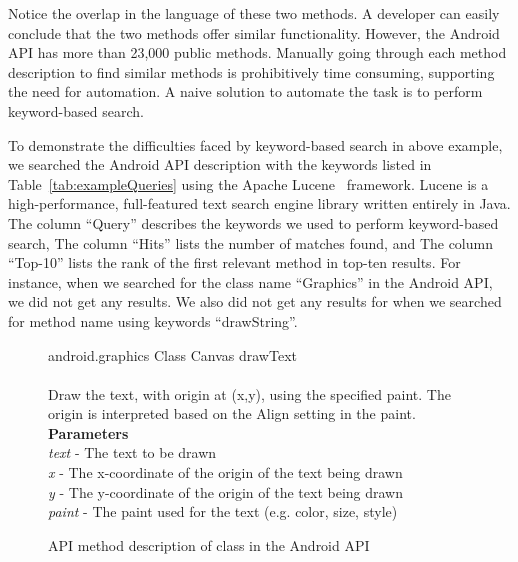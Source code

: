 Notice the overlap in the language of these two methods.
A developer can easily conclude that
the two methods offer similar functionality.
However, the Android API has more than 23,000 public methods.
Manually going through each method description to find similar methods
is prohibitively time consuming, supporting the need for automation.
A naive solution to automate the task is to perform keyword-based search. 
 
To demonstrate the difficulties faced by keyword-based search in above example,
we searched the Android API description with the keywords listed in Table~\ref{tab:exampleQueries} using the Apache Lucene~\cite{lucene} framework.
Lucene is a high-performance, full-featured text search engine library written entirely in Java.
The column ``Query'' describes the keywords we used to perform keyword-based search,
The column ``Hits'' lists the number of matches found, and
The column ``Top-10'' lists the rank of the first relevant method in top-ten results.
For instance, when we searched for the class name ``Graphics'' in the Android API,
we did not get any results.
We also did not get any results for when we searched for method name using keywords ``drawString''. 

\begin{figure}
	\begin{framed}
		\begin{small}
			{\small android.graphics} {\normalsize Class Canvas} {\large drawText}\\
			\\
			Draw the text, with origin at (x,y), using the specified paint. The origin is interpreted based on the Align setting in the paint.\\
			\textbf{Parameters}\\
			\textit{text} - The text to be drawn\\
			\textit{x} - The x-coordinate of the origin of the text being drawn\\
			\textit{y} - The y-coordinate of the origin of the text being drawn\\
			\textit{paint} - The paint used for the text (e.g. color, size, style)
		\end{small}
	\end{framed}
	\vspace{-2ex}
	\caption{ API method description of  class in the Android API}
	\label{fig:drawTextJavadoc}
	\vspace*{-4ex}
\end{figure}

